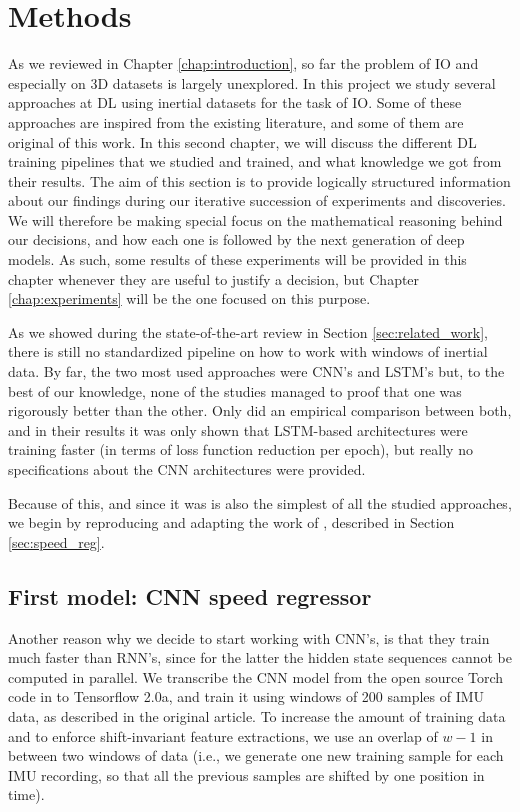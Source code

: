 \chapter{Methods}\label{chap:methods}

As we reviewed in Chapter \ref{chap:introduction}, so far the problem of IO and especially on 3D datasets is largely unexplored.
In this project we study several approaches at DL using inertial datasets for the task of IO.
Some of these approaches are inspired from the existing literature, and some of them are original of this work.
In this second chapter, we will discuss the different DL training pipelines that we studied and trained, and what knowledge we got from their results.
The aim of this section is to provide logically structured information about our findings during our  iterative succession of experiments and discoveries.
We will therefore be making special focus on the mathematical reasoning behind our decisions, and how each one is followed by the next generation of deep models.
As such, some results of these experiments will be provided in this chapter whenever they are useful to justify a decision, but Chapter \ref{chap:experiments} will be the one focused on this purpose.

As we showed during the state-of-the-art review in Section \ref{sec:related_work}, there is still no standardized pipeline on how to work with windows of inertial data. 
By far, the two most used approaches were CNN's and LSTM's but, to the best of our knowledge, none of the studies managed to proof that one was rigorously better than the other. 
Only \cite{DBLP:journals/corr/abs-1802-02209} did an empirical comparison between both, and in their results it was only shown that LSTM-based architectures were training faster (in terms of loss function reduction per epoch), but really no specifications about the CNN architectures were provided.

Because of this, and since it was is also the simplest of all the studied approaches, we begin by reproducing and adapting the work of \cite{DBLP:journals/corr/abs-1808-03485}, described in Section \ref{sec:speed_reg}. 

\section{First model: CNN speed regressor}

Another reason why we decide to start working with CNN's, is that they train much faster than RNN's, since for the latter the hidden state sequences cannot be computed in parallel. 
We transcribe the CNN model from the open source Torch code in \cite{DBLP:journals/corr/abs-1808-03485} to Tensorflow 2.0a, and train it using windows of 200 samples of IMU data, as described in the original article. 
To increase the amount of training data and to enforce shift-invariant feature extractions, we use an overlap of $w-1$ in between two windows of data (i.e., we generate one new training sample for each IMU recording, so that all the previous samples are shifted by one position in time).

